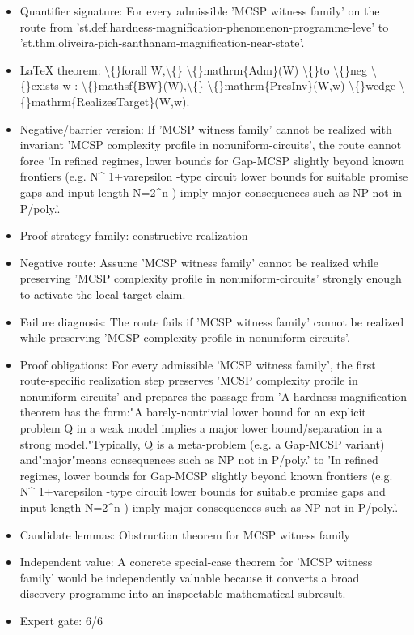 \documentclass[11pt]{article}
\begin{document}
\begin{itemize}
\item Quantifier signature: For every admissible 'MCSP witness family' on the route from 'st.def.hardness-magnification-phenomenon-programme-leve' to 'st.thm.oliveira-pich-santhanam-magnification-near-state'.
\item LaTeX theorem: \textbackslash\{\}forall W,\textbackslash\{\} \textbackslash\{\}mathrm\{Adm\}(W) \textbackslash\{\}to \textbackslash\{\}neg \textbackslash\{\}exists w : \textbackslash\{\}mathsf\{BW\}(W),\textbackslash\{\} \textbackslash\{\}mathrm\{PresInv\}(W,w) \textbackslash\{\}wedge \textbackslash\{\}mathrm\{RealizesTarget\}(W,w).
\item Negative/barrier version: If 'MCSP witness family' cannot be realized with invariant 'MCSP complexity profile in nonuniform-circuits', the route cannot force 'In refined regimes, lower bounds for Gap-MCSP slightly beyond known frontiers (e.g. N\textasciicircum{} 1+varepsilon -type circuit lower bounds for suitable promise gaps and input length N=2\textasciicircum{}n ) imply major consequences such as NP not in P/poly.'.
\item Proof strategy family: constructive-realization
\item Negative route: Assume 'MCSP witness family' cannot be realized while preserving 'MCSP complexity profile in nonuniform-circuits' strongly enough to activate the local target claim.
\item Failure diagnosis: The route fails if 'MCSP witness family' cannot be realized while preserving 'MCSP complexity profile in nonuniform-circuits'.
\item Proof obligations: For every admissible 'MCSP witness family', the first route-specific realization step preserves 'MCSP complexity profile in nonuniform-circuits' and prepares the passage from 'A hardness magnification theorem has the form:"A barely-nontrivial lower bound for an explicit problem Q in a weak model implies a major lower bound/separation in a strong model."Typically, Q is a meta-problem (e.g. a Gap-MCSP variant) and"major"means consequences such as NP not in P/poly.' to 'In refined regimes, lower bounds for Gap-MCSP slightly beyond known frontiers (e.g. N\textasciicircum{} 1+varepsilon -type circuit lower bounds for suitable promise gaps and input length N=2\textasciicircum{}n ) imply major consequences such as NP not in P/poly.'.
\item Candidate lemmas: Obstruction theorem for MCSP witness family
\item Independent value: A concrete special-case theorem for 'MCSP witness family' would be independently valuable because it converts a broad discovery programme into an inspectable mathematical subresult.
\item Expert gate: 6/6
\end{itemize}
\end{document}
